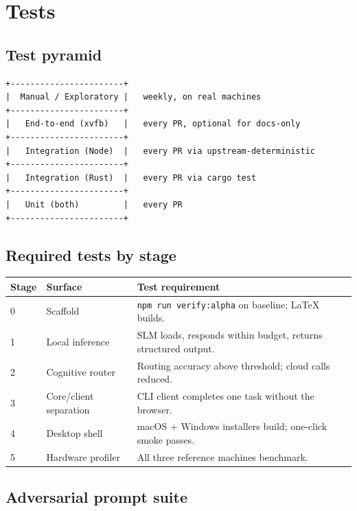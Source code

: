 
\chapter{Tests}

\section{Test pyramid}

\begin{verbatim}
+-----------------------+
|  Manual / Exploratory |   weekly, on real machines
+-----------------------+
|   End-to-end (xvfb)   |   every PR, optional for docs-only
+-----------------------+
|   Integration (Node)  |   every PR via upstream-deterministic
+-----------------------+
|   Integration (Rust)  |   every PR via cargo test
+-----------------------+
|   Unit (both)         |   every PR
+-----------------------+
\end{verbatim}

\section{Required tests by stage}

\begin{longtable}{p{1.0cm}p{4.2cm}p{8.2cm}}
\toprule
\textbf{Stage} & \textbf{Surface} & \textbf{Test requirement} \\
\midrule
0 & Scaffold & \texttt{npm run verify:alpha} on baseline; LaTeX builds. \\
1 & Local inference & SLM loads, responds within budget, returns
structured output. \\
2 & Cognitive router & Routing accuracy above threshold; cloud calls
reduced. \\
3 & Core/client separation & CLI client completes one task without
the browser. \\
4 & Desktop shell & macOS + Windows installers build; one-click
smoke passes. \\
5 & Hardware profiler & All three reference machines benchmark. \\
\bottomrule
\end{longtable}

\section{Adversarial prompt suite}

